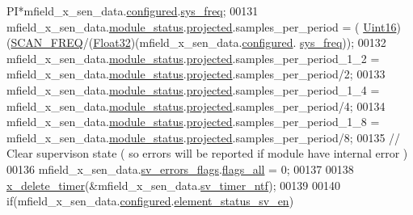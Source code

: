 \begin{DoxyCode}
      PI*mfield\_x\_sen\_data.\hyperlink{a00025_a94b2d1f6ea4ab334c74d24984dd27843}{configured}.\hyperlink{a00021_aa57be45aa1320405a885474010159c9e}{sys\_freq};
00131               mfield\_x\_sen\_data.\hyperlink{a00025_adfab5a5d8b45a93dfb13edb24e2b80e3}{module\_status}.\hyperlink{a00019_af2267fb093fb5dcaa006a570a6da3b6b}{projected}.samples\_per\_period       = (
      \hyperlink{a00072_a59a9f6be4562c327cbfb4f7e8e18f08b}{Uint16})(\hyperlink{a00021_a8127170b687c1f67a968886c128e76e4}{SCAN\_FREQ}/(\hyperlink{a00072_a87d38f886e617ced2698fc55afa07637}{Float32})(mfield\_x\_sen\_data.\hyperlink{a00025_a94b2d1f6ea4ab334c74d24984dd27843}{configured}.
      \hyperlink{a00021_aa57be45aa1320405a885474010159c9e}{sys\_freq}));
00132               mfield\_x\_sen\_data.\hyperlink{a00025_adfab5a5d8b45a93dfb13edb24e2b80e3}{module\_status}.\hyperlink{a00019_af2267fb093fb5dcaa006a570a6da3b6b}{projected}.samples\_per\_period\_1\_2   = 
      mfield\_x\_sen\_data.\hyperlink{a00025_adfab5a5d8b45a93dfb13edb24e2b80e3}{module\_status}.\hyperlink{a00019_af2267fb093fb5dcaa006a570a6da3b6b}{projected}.samples\_per\_period/2;
00133               mfield\_x\_sen\_data.\hyperlink{a00025_adfab5a5d8b45a93dfb13edb24e2b80e3}{module\_status}.\hyperlink{a00019_af2267fb093fb5dcaa006a570a6da3b6b}{projected}.samples\_per\_period\_1\_4   = 
      mfield\_x\_sen\_data.\hyperlink{a00025_adfab5a5d8b45a93dfb13edb24e2b80e3}{module\_status}.\hyperlink{a00019_af2267fb093fb5dcaa006a570a6da3b6b}{projected}.samples\_per\_period/4;
00134               mfield\_x\_sen\_data.\hyperlink{a00025_adfab5a5d8b45a93dfb13edb24e2b80e3}{module\_status}.\hyperlink{a00019_af2267fb093fb5dcaa006a570a6da3b6b}{projected}.samples\_per\_period\_1\_8   = 
      mfield\_x\_sen\_data.\hyperlink{a00025_adfab5a5d8b45a93dfb13edb24e2b80e3}{module\_status}.\hyperlink{a00019_af2267fb093fb5dcaa006a570a6da3b6b}{projected}.samples\_per\_period/8;
00135               \textcolor{comment}{// Clear supervison state ( so errors will be reported if module have internal error )}
00136               mfield\_x\_sen\_data.\hyperlink{a00025_aaeec6b0609dba31393f337abf1cce3d3}{sv\_errors\_flags}.\hyperlink{a00022_a1caa87b00c878186140c3bac9c8acf3b}{flags\_all} = 0;
00137 
00138               \hyperlink{a00036_ab69e9af4cfa717e870d587906283635c}{x\_delete\_timer}(&mfield\_x\_sen\_data.\hyperlink{a00025_ada91b200053f2d93e3639dc4ee3415b4}{sv\_timer\_ntf});
00139 
00140               \textcolor{keywordflow}{if}(mfield\_x\_sen\_data.\hyperlink{a00025_a94b2d1f6ea4ab334c74d24984dd27843}{configured}.\hyperlink{a00021_afeb3f74725269028a60926f98890c22b}{element\_status\_sv\_en})

\end{DoxyCode}
